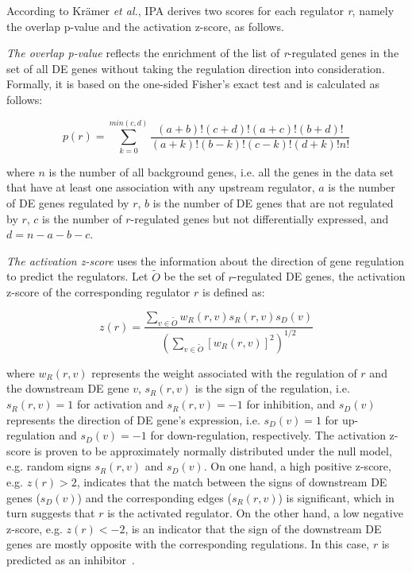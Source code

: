 According to Kr\"{a}mer \textit{et al.}, IPA derives two scores for each regulator \textit{r}, namely the overlap p-value and the activation z-score, as follows.

\emph{The overlap p-value} reflects the enrichment of the list of \textit{r}-regulated genes in the set of all DE genes without taking the regulation direction into consideration. Formally, it is based on the one-sided Fisher's exact test and is calculated as follows:

\begin{equation*}
p(r)=\sum_{k = 0}^{min(c,d)} \frac{(a+b)!(c+d)!(a+c)!(b+d)!}{(a+k)!(b-k)!(c-k)!(d+k)!n!}
\end{equation*}

where $n$ is the number of all background genes, i.e. all the genes in the data set that have at least one association with any upstream regulator, $a$ is the number of DE genes regulated by $r$, $b$ is the number of DE genes that are not regulated by $r$, $c$ is the number of $r$-regulated genes but not differentially expressed, and $d=n-a-b-c$.

\emph{The activation z-score} uses the information about the direction of gene regulation to predict the regulators. Let $\tilde{O}$ be the set of $r$-regulated DE genes, the activation z-score of the corresponding regulator $r$ is defined as:


\begin{equation*}
z(r) =  \frac{\sum\limits_{v \in \tilde{O}}w_{R}(r,v) s_{R}(r,v) s_{D}(v)}{\left(\sum\limits_{v \in \tilde{O}}[w_{R}(r,v)]^2\right)^{1/2}}
\end{equation*}

where $w_{R}(r,v)$ represents the weight associated with the regulation of $r$ and the downstream DE gene $v$, $s_{R}(r,v)$ is the sign of the regulation, i.e. $s_{R}(r,v)=1$ for activation and $s_{R}(r,v)=-1$ for inhibition, and $s_{D}(v)$ represents the direction of DE gene's expression, i.e. $s_{D}(v)=1$ for up-regulation and $s_{D}(v)=-1$ for down-regulation, respectively. The activation z-score is proven to be approximately normally distributed under the null model, e.g. random signs $s_{R}(r,v)$ and $s_{D}(v)$. On one hand, a high positive z-score, e.g. $z(r) > 2$, indicates that the match between the signs of downstream DE genes ($s_{D}(v)$) and the corresponding edges ($s_{R}(r,v)$) is significant, which in turn suggests that $r$ is the activated regulator. On the other hand, a low negative z-score, e.g. $z(r) <  -2$, is an indicator that the sign of the downstream DE genes are mostly opposite with the corresponding regulations. In this case, $r$ is predicted as an inhibitor~\cite{kramer2013causal}.




